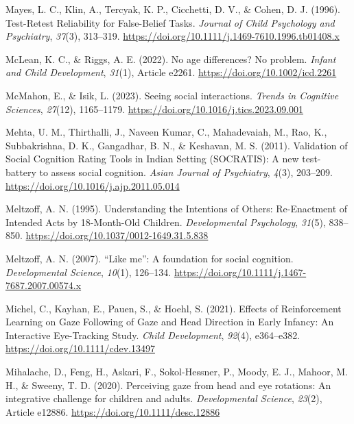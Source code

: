 \documentclass[
]{scrbook}
\newlength{\cslhangindent}
\newenvironment{CSLReferences}[2] %
 {\begin{list}{}{%
  \setlength{\itemindent}{0pt}
  \setlength{\leftmargin}{0pt}
  \setlength{\parsep}{0pt}
  \ifodd #1
   \setlength{\leftmargin}{\cslhangindent}
   \setlength{\itemindent}{-1\cslhangindent}
  \fi
  \setlength{\itemsep}{#2\baselineskip}}}
 {\end{list}}
\begin{document}
\begin{CSLReferences}{1}{0}
Mayes, L. C., Klin, A., Tercyak, K. P., Cicchetti, D. V., \& Cohen, D. J. (1996). Test-{Retest Reliability} for {False-Belief Tasks}. \emph{Journal of Child Psychology and Psychiatry}, \emph{37}(3), 313--319. \url{https://doi.org/10.1111/j.1469-7610.1996.tb01408.x}

McLean, K. C., \& Riggs, A. E. (2022). No age differences? {No} problem. \emph{Infant and Child Development}, \emph{31}(1), Article e2261. \url{https://doi.org/10.1002/icd.2261}

McMahon, E., \& Isik, L. (2023). Seeing social interactions. \emph{Trends in Cognitive Sciences}, \emph{27}(12), 1165--1179. \url{https://doi.org/10.1016/j.tics.2023.09.001}

Mehta, U. M., Thirthalli, J., Naveen Kumar, C., Mahadevaiah, M., Rao, K., Subbakrishna, D. K., Gangadhar, B. N., \& Keshavan, M. S. (2011). Validation of {Social Cognition Rating Tools} in {Indian Setting} ({SOCRATIS}): {A} new test-battery to assess social cognition. \emph{Asian Journal of Psychiatry}, \emph{4}(3), 203--209. \url{https://doi.org/10.1016/j.ajp.2011.05.014}

Meltzoff, A. N. (1995). Understanding the {Intentions} of {Others}: {Re-Enactment} of {Intended Acts} by 18-{Month-Old Children}. \emph{Developmental Psychology}, \emph{31}(5), 838--850. \url{https://doi.org/10.1037/0012-1649.31.5.838}

Meltzoff, A. N. (2007). {``{Like} me''}: A foundation for social cognition. \emph{Developmental Science}, \emph{10}(1), 126--134. \url{https://doi.org/10.1111/j.1467-7687.2007.00574.x}

Michel, C., Kayhan, E., Pauen, S., \& Hoehl, S. (2021). Effects of {Reinforcement Learning} on {Gaze Following} of {Gaze} and {Head Direction} in {Early Infancy}: {An Interactive Eye-Tracking Study}. \emph{Child Development}, \emph{92}(4), e364--e382. \url{https://doi.org/10.1111/cdev.13497}

Mihalache, D., Feng, H., Askari, F., Sokol-Hessner, P., Moody, E. J., Mahoor, M. H., \& Sweeny, T. D. (2020). Perceiving gaze from head and eye rotations: {An} integrative challenge for children and adults. \emph{Developmental Science}, \emph{23}(2), Article e12886. \url{https://doi.org/10.1111/desc.12886}


\end{CSLReferences}
\end{document}
